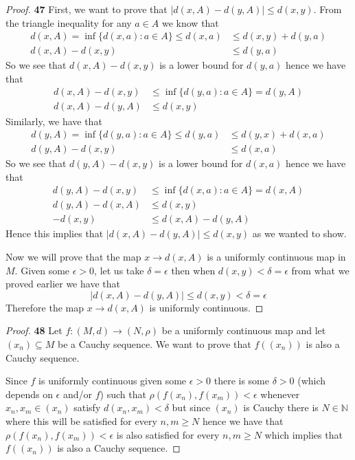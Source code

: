 \documentclass[11pt]{article}
\newcommand{\N}{\mathbb{N}}
\theoremstyle{definition}
\begin{document}
    \begin{proof}{\textbf{47}}
        First, we want to prove that $|d(x, A) - d(y, A)| \leq d(x,y)$. From the
        triangle inequality for any $a\in A$ we know that
        \begin{align*}
            d(x,A) = \inf\{d(x,a): a \in A \} \leq d(x,a) &\leq d(x,y) + d(y,a)\\
            d(x,A) - d(x,y) &\leq d(y,a)
        \end{align*}
        So we see that $d(x,A) - d(x,y)$ is a lower bound for $d(y,a)$
        hence we have that
        \begin{align*}
            d(x,A) - d(x,y) &\leq \inf\{d(y,a): a \in A\} = d(y,A)\\
            d(x,A) - d(y,A) &\leq d(x,y)
        \end{align*}
        Similarly, we have that
        \begin{align*}
            d(y,A) = \inf\{d(y,a): a \in A \} \leq d(y,a) &\leq d(y,x) + d(x,a)\\
            d(y,A) - d(x,y) &\leq d(x,a)
        \end{align*}
        So we see that $d(y,A) - d(x,y)$ is a lower bound for $d(x,a)$
        hence we have that
        \begin{align*}
            d(y,A) - d(x,y) &\leq \inf\{d(x,a): a \in A\} = d(x,A)\\
            d(y,A) - d(x,A) &\leq d(x,y)\\
            -d(x,y) &\leq d(x,A) - d(y,A) 
        \end{align*}
        Hence this implies that $|d(x,A) - d(y,A)| \leq d(x,y)$ as we wanted to
        show.

        Now we will prove that the map $x \to d(x, A)$ is a uniformly continuous
        map in $M$.
        Given some $\epsilon > 0$, let us take $\delta = \epsilon$ then when
        $d(x,y) < \delta = \epsilon$ from what we proved earlier we have that
        $$|d(x,A) - d(y,A)| \leq d(x,y) < \delta = \epsilon$$
        Therefore the map $x \to d(x, A)$ is uniformly continuous.
    \end{proof}
    \begin{proof}{\textbf{48}}
        Let $f:(M,d) \to (N, \rho)$ be a uniformly continuous map
        and let $(x_n) \subseteq M$ be a Cauchy sequence. We want to prove that
        $f((x_n))$ is also a Cauchy sequence.

        Since $f$ is uniformly continuous given some $\epsilon > 0$ there is
        some $\delta > 0$ (which depends on $\epsilon$ and/or $f$) such that
        $\rho(f(x_n), f(x_m)) < \epsilon$ whenever $x_n, x_m \in (x_n)$ satisfy
        $d(x_n, x_m) < \delta$ but since $(x_n)$ is Cauchy there is $N \in \N$
        where this will be satisfied for every $n,m \geq N$ hence we have that
        $\rho(f(x_n), f(x_m)) < \epsilon$ is also satisfied for every
        $n,m \geq N$ which implies that $f((x_n))$ is also a Cauchy sequence.
    \end{proof}
\end{document}
